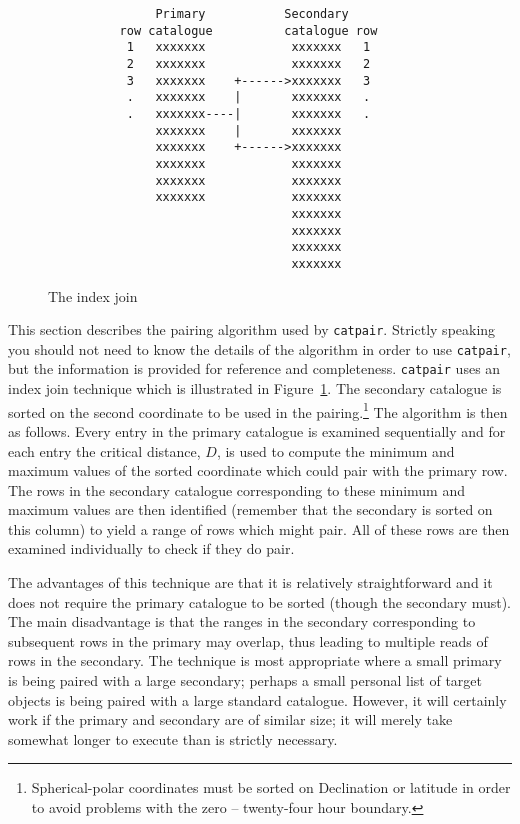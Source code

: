 \documentclass[twoside,11pt]{article}
\renewcommand{\_}{\texttt{\symbol{95}}}
\begin{document}
\begin{figure}[htbp]

\begin{verbatim}
               Primary           Secondary
          row catalogue          catalogue row
           1   xxxxxxx            xxxxxxx   1
           2   xxxxxxx            xxxxxxx   2
           3   xxxxxxx    +------>xxxxxxx   3
           .   xxxxxxx    |       xxxxxxx   .
           .   xxxxxxx----|       xxxxxxx   .
               xxxxxxx    |       xxxxxxx
               xxxxxxx    +------>xxxxxxx
               xxxxxxx            xxxxxxx
               xxxxxxx            xxxxxxx
               xxxxxxx            xxxxxxx
                                  xxxxxxx
                                  xxxxxxx
                                  xxxxxxx
                                  xxxxxxx
\end{verbatim}

\caption{The index join \label{PAIR_INDEX_JOIN} }

\end{figure}

This section describes the pairing algorithm used by {\tt catpair}.
Strictly speaking you should not need to know the details of the
algorithm in order to use {\tt catpair}, but the information is
provided for reference and completeness. {\tt catpair} uses an index join 
technique which is illustrated in Figure~\ref{PAIR_INDEX_JOIN}. The
secondary catalogue is sorted on the second coordinate to be used in
the pairing.\footnote{Spherical-polar coordinates must be sorted on 
Declination or latitude in order to avoid problems with the zero --
twenty-four hour boundary.} The algorithm is then as follows. Every
entry in the primary catalogue is examined sequentially and for each
entry the critical distance, $D$, is used to compute the minimum and
maximum values of the sorted coordinate which could pair with the
primary row. The rows in the secondary catalogue corresponding to these
minimum and maximum values are then identified (remember that the
secondary is sorted on this column) to yield a range of rows which might
pair. All of these rows are then examined individually to check if
they do pair.

The advantages of this technique are that it is relatively straightforward
and it does not require the primary catalogue to be sorted (though the 
secondary must). The main disadvantage is that the ranges in the secondary 
corresponding to subsequent rows in the primary may overlap, thus leading 
to multiple reads of rows in the secondary. The technique is most 
appropriate where a small primary is being paired with a large secondary; 
perhaps a small personal list of target objects is being paired with a
large standard catalogue. However, it will certainly work if
the primary and secondary are of similar size; it will merely take
somewhat longer to execute than is strictly necessary.
\end{document}
